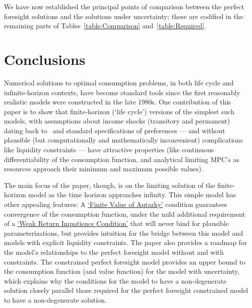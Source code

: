 \documentclass[BufferStockTheory]{subfiles}
\begin{document}
We have now established the principal points of comparison between the perfect foresight solutions and the solutions under uncertainty; these are codified in the remaining parts of Tables~\ref{table:Comparison} and~\ref{table:Required}.

\hypertarget{Factors-Defined-And-Compared}{}


\hypertarget{Required}{}


\newpage 
\hypertarget{Conclusions}{}
\section{Conclusions}

Numerical solutions to optimal consumption problems, in both life cycle and infinite-horizon contexts, have become standard tools since the first reasonably realistic models were constructed in the late 1980s.
One contribution of this paper is to show that finite-horizon (`life cycle') versions of the simplest such models, with assumptions about income shocks (transitory and permanent) dating back to~\cite{friedmanATheory} and standard specifications of preferences --- and without plausible (but computationally and mathematically inconvenient) complications like liquidity constraints --- have attractive properties (like continuous differentiability of the consumption function, and analytical limiting MPC's as resources approach their minimum and maximum possible values).%

The main focus of the paper, though, is on the limiting solution of the finite-horizon model as the time horizon approaches infinity.
This simple model has other appealing features: A \hyperlink{FVAC}{`Finite Value of Autarky'} condition guarantees convergence of the consumption function, under the mild additional requirement of a \hyperlink{WRIC}{`Weak Return Impatience Condition'} that will never bind for plausible parameterizations, but provides intuition for the bridge between this model and models with explicit liquidity constraints.
The paper also provides a roadmap for the model's relationships to the perfect foresight model without and with constraints.
The constrained perfect foresight model provides an upper bound to the consumption function (and value function) for the model with uncertainty, which explains why the conditions for the model to have a non-degenerate solution closely parallel those required for the perfect foresight constrained model to have a non-degenerate solution.
\end{document}

